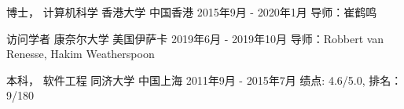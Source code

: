 

\begin{cventries}


\cventry
{博士， 计算机科学} %
{香港大学} %
{中国香港} %
{2015年9月 - 2020年1月} %
{ %
导师：崔鹤鸣
}


\cventry
{访问学者} %
{康奈尔大学} %
{美国伊萨卡} %
{2019年6月 - 2019年10月} %
{ %
导师：Robbert van Renesse, Hakim Weatherspoon
}


\cventry
{本科， 软件工程} %
{同济大学} %
{中国上海} %
{2011年9月 - 2015年7月} %
{ %
绩点: 4.6/5.0, 排名：9/180
}

\end{cventries}